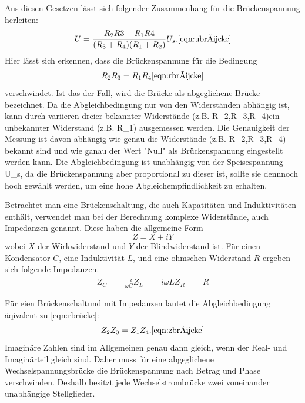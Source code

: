 Aus diesen Gesetzen lässt sich folgender Zusammenhang für die Brückenspannung
herleiten:
\begin{equation}
  U=\frac{R_{2}R{3}-R_{1}R{4}}{(R_{3}+R_{4})(R_{1}+R_{2})}U_{s}.
  \ref{eqn:ubrücke}
\end{equation}
Hier lässt sich erkennen, dass die Brückenspannung für die Bedingung
\begin{equation}
  R_{2}R_{3}=R_{1}R_{4}
  \ref{eqn:rbrücke}
\end{equation}
verschwindet. Ist das der Fall, wird die Brücke als abgeglichene Brücke bezeichnet.
Da die Abgleichbedingung nur von den Widerständen abhängig ist, kann durch
variieren dreier bekannter Widerstände (z.B. R_{2},R_{3},R_{4})ein unbekannter
Widerstand (z.B. R_{1}) ausgemessen werden. Die Genauigkeit der Messung ist davon
abhängig wie genau die Widerstände (z.B. R_{2},R_{3},R_{4}) bekannt sind und wie
ganau der Wert "Null" als Brückenspannung eingestellt werden kann.
Die Abgleichbedingung ist unabhängig von der Speisespannung U_{s}, da
die Brückenspannung aber proportional zu dieser ist, sollte sie
dennnoch hoch gewählt werden, um eine hohe Abgleichempfindlichkeit zu erhalten.

\noindent Betrachtet man eine Brückenschaltung, die auch Kapatitäten und
Induktivitäten enthält, verwendet man bei der Berechnung komplexe
Widerstände, auch Impedanzen genannt. Diese haben die allgemeine Form
\begin{equation}
  Z = X + iY
\end{equation}
wobei $X$ der Wirkwiderstand und $Y$ der Blindwiderstand ist. Für einen
Kondensator $C$, eine Induktivität $L$, und eine ohmschen Widerstand $R$
ergeben sich folgende Impedanzen.
\begin{align*}
  Z_{C} &= \frac{-i}{\omega C}
  Z_{L} &= i \omega L
  Z_{R} &= R
\end{align*}

Für eien Brückenschaltund mit Impedanzen lautet die Abgleichbedingung äqivalent zu
\ref{eqn:rbrücke}:
\begin{equation}
  Z_{2}Z_{3}=Z_{1}Z_{4}.
  \ref{eqn:zbrücke}
\end{equation}
Imaginäre Zahlen sind im Allgemeinen genau dann gleich, wenn der Real- und
Imaginärteil gleich sind. Daher muss für eine abgeglichene Wechselspannungsbrücke
die Brückenspannung nach Betrag und Phase verschwinden.
Deshalb besitzt jede Wechselstrombrücke zwei voneinander unabhängige Stellglieder.

